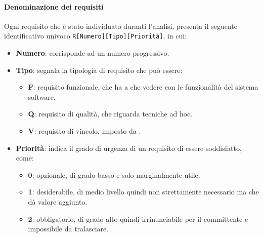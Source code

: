 		\paragraph{Denominazione dei requisiti}\label{PP:Sviluppo:AdR:DenominazioneRequisiti}
		Ogni requisito che è stato individuato duranti l'analisi, presenta il seguente identificativo univoco \texttt{R[Numero][Tipo][Priorità]}, in cui:
		\begin{itemize}
		 	\item \textbf{Numero}: corrisponde ad un numero progressivo.
		 	\item \textbf{Tipo}: segnala la tipologia di requisito che può essere:
		 	\begin{itemize}
		 		\item \textbf{F}: requisito funzionale, che ha a che vedere con le funzionalità del sistema software.
		 		\item \textbf{Q}: requisito di qualità, che riguarda tecniche ad hoc.
		 		\item \textbf{V}: requisito di vincolo, imposto da \II.
		 	\end{itemize}
	 		\item \textbf{Priorità}: indica il grado di urgenza di un requisito di essere soddisfatto, come:
	 		\begin{itemize}
	 			\item \textbf{0}: opzionale, di grado basso e solo marginalmente utile.
	 			\item \textbf{1}: desiderabile, di medio livello quindi non strettamente necessario ma che dà valore aggiunto.
	 			\item \textbf{2}: obbligatorio, di grado alto quindi irrinunciabile per il committente e impossibile da tralasciare.
	 		\end{itemize}
		\end{itemize}


